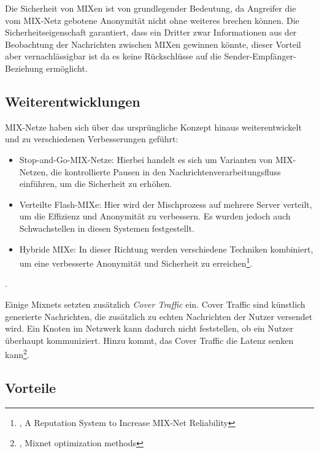 Die Sicherheit von MIXen ist von grundlegender Bedeutung, da Angreifer die vom MIX-Netz gebotene Anonymität nicht ohne weiteres brechen können. Die Sicherheitseigenschaft garantiert, dass ein Dritter zwar Informationen aus der Beobachtung der Nachrichten zwischen MIXen gewinnen könnte, dieser Vorteil aber vernachlässigbar ist da es keine Rückschlüsse auf die Sender-Empfänger-Beziehung ermöglicht.

\subsection{Weiterentwicklungen}
\label{chap:mixnet_enhancements}

MIX-Netze haben sich über das ursprüngliche Konzept hinaus weiterentwickelt und zu verschiedenen Verbesserungen geführt:

\begin{itemize}
    \item Stop-and-Go-MIX-Netze: Hierbei handelt es sich um Varianten von MIX-Netzen, die kontrollierte Pausen in den Nachrichtenverarbeitungsfluss einführen, um die Sicherheit zu erhöhen.
    \item Verteilte \glqq Flash-MIXe\grqq: Hier wird der Mischprozess auf mehrere Server verteilt, um die Effizienz und Anonymität zu verbessern. Es wurden jedoch auch Schwachstellen in diesen Systemen festgestellt.
    \item Hybride MIXe: In dieser Richtung werden verschiedene Techniken kombiniert, um eine verbesserte Anonymität und Sicherheit zu erreichen\footnote{\cite{MIXNetReliability}, A Reputation System to Increase MIX-Net Reliability}.
\end{itemize}.

Einige Mixnets setzten zusätzlich \textit{Cover Traffic} ein. Cover Traffic sind künstlich generierte Nachrichten, die zusätzlich zu echten Nachrichten der Nutzer versendet wird. Ein Knoten im Netzwerk kann dadurch nicht feststellen, ob ein Nutzer überhaupt kommuniziert. Hinzu kommt, das Cover Traffic die Latenz senken kann\footnote{\cite{MixnetOptimizationMethods}, Mixnet optimization methods}.

\subsection{Vorteile}
\label{chap:mixnet_advantages}


